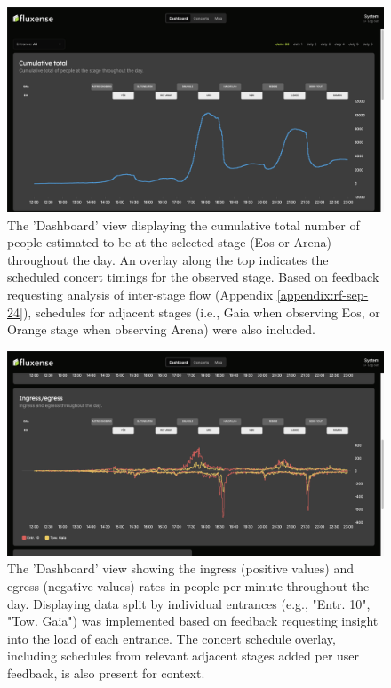 \begin{figure}[H]
  \centering
  \includegraphics[width=\textwidth]{Pictures/Misc/Frontend/cum_total.png}
  \caption{The 'Dashboard' view displaying the cumulative total number of people estimated to be at the selected stage (Eos or Arena) throughout the day. An overlay along the top indicates the scheduled concert timings for the observed stage. Based on feedback requesting analysis of inter-stage flow (Appendix \ref{appendix:rf-sep-24}), schedules for adjacent stages (i.e., Gaia when observing Eos, or Orange stage when observing Arena) were also included.}
  \label{fig:showcase:dashboard}

\end{figure}


\begin{figure}[H]
  \centering
  \includegraphics[width=\textwidth]{Pictures/Misc/Frontend/ingress_egress.png}
  \caption{The 'Dashboard' view showing the ingress (positive values) and egress (negative values) rates in people per minute throughout the day. Displaying data split by individual entrances (e.g., "Entr. 10", "Tow. Gaia") was implemented based on feedback requesting insight into the load of each entrance. The concert schedule overlay, including schedules from relevant adjacent stages added per user feedback, is also present for context.}
  \label{fig:showcase:ingress-egress}

\end{figure}


